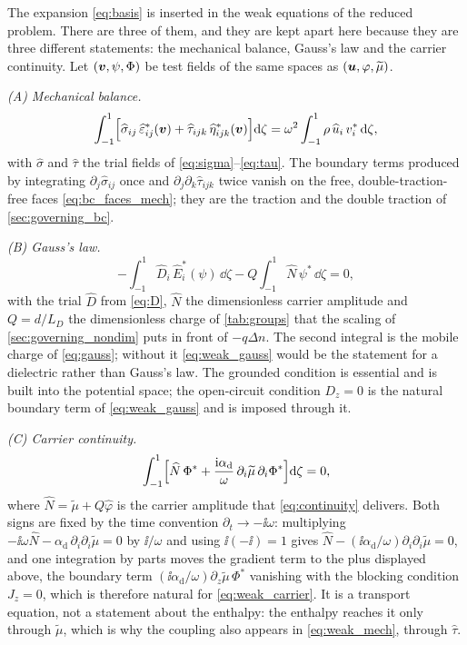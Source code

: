 The expansion \eqref{eq:basis} is inserted in the weak equations of the reduced
problem.  There are three of them, and they are kept apart here because they are
three different statements: the mechanical balance, Gauss's law and the carrier
continuity.  Let $(\boldsymbol{v},\psi,\Phi)$ be test fields of the same spaces as
$(\boldsymbol{u},\varphi,\widetilde\mu)$.

\emph{(A) Mechanical balance.}
\begin{equation}
\label{eq:weak_mech}
\int_{-1}^{1}\Bigl[\widehat\sigma_{ij}\,\widehat\varepsilon^{*}_{ij}(\boldsymbol{v})
+\widehat\tau_{ijk}\,\widehat\eta^{*}_{ijk}(\boldsymbol{v})\Bigr]\mathrm{d}\zeta
=\omega^{2}\int_{-1}^{1}\rho\,\widehat u_i\,v_i^{*}\,\mathrm{d}\zeta ,
\end{equation}
with $\widehat\sigma$ and $\widehat\tau$ the trial fields of
\eqref{eq:sigma}--\eqref{eq:tau}.  The boundary terms produced by integrating
$\partial_j\widehat\sigma_{ij}$ once and $\partial_j\partial_k\widehat\tau_{ijk}$
twice vanish on the free, double-traction-free faces
\eqref{eq:bc_faces_mech}; they are the traction and the double traction of
\cref{sec:governing_bc}.

\emph{(B) Gauss's law.}
\begin{equation}
\label{eq:weak_gauss}
-\int_{-1}^{1}\widehat D_i\,\widehat E_i^{*}(\psi)\,\dd\zeta
-Q\int_{-1}^{1}\widehat N\,\psi^{*}\,\dd\zeta=0 ,
\end{equation}
with the trial $\widehat D$ from \eqref{eq:D}, $\widehat N$ the dimensionless
carrier amplitude and $Q=d/L_D$ the dimensionless charge of \cref{tab:groups}
that the scaling of \cref{sec:governing_nondim} puts in front of $-q\Delta n$.
The second integral is the mobile charge of \eqref{eq:gauss};
without it \eqref{eq:weak_gauss} would be the statement for a dielectric rather
than Gauss's law.  The grounded condition is essential and is built into the
potential space; the open-circuit condition $D_z=0$ is the natural boundary term
of \eqref{eq:weak_gauss} and is imposed through it.

\emph{(C) Carrier continuity.}
\begin{equation}
\label{eq:weak_carrier}
\int_{-1}^{1}\Bigl[\widehat N\,\Phi^{*}
+\frac{\mathrm{i}\alpha_{\mathrm d}}{\omega}\,\partial_i\widetilde\mu\,\partial_i\Phi^{*}\Bigr]\mathrm{d}\zeta=0 ,
\end{equation}
where $\widehat N=\widetilde\mu+Q\widehat\varphi$ is the carrier amplitude that
\eqref{eq:continuity} delivers.  Both signs are fixed by the time convention
$\partial_t\to-\ii\omega$: multiplying
$-\ii\omega\widehat N-\alpha_{\mathrm d}\,\partial_i\partial_i\widetilde\mu=0$
by $\ii/\omega$ and using $\ii(-\ii)=1$ gives
$\widehat N-(\ii\alpha_{\mathrm d}/\omega)\partial_i\partial_i\widetilde\mu=0$,
and one integration by parts moves the gradient term to the plus displayed
above, the boundary term
$(\ii\alpha_{\mathrm d}/\omega)\partial_z\widetilde\mu\,\Phi^{*}$ vanishing with
the blocking condition $J_z=0$, which is therefore natural for
\eqref{eq:weak_carrier}.  It is a transport
equation, not a statement about the enthalpy: the enthalpy reaches it only through
$\widetilde\mu$, which is why the coupling also appears in \eqref{eq:weak_mech},
through $\widehat\tau$.

